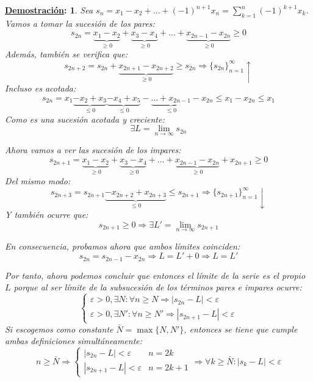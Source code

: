 \documentclass[10pt,a4paper,openright]{book}
\theoremstyle{break}
\newtheorem*{demo}{\underline{Demostración}:}
\begin{document}
\begin{demo}
Sea $s_n = x_1 - x_2 + \ldots + (-1)^{n+1}x_n = \sum_{k=1}^{n} (-1)^{k+1} x_k$. Vamos a tomar la sucesión de los pares:
$$s_{2n} = \underbrace{x_1 - x_2}_{\geq 0} + \underbrace{x_3 - x_4}_{\geq 0} + \ldots + \underbrace{x_{2n-1} - x_{2n}}_{\geq 0} \geq 0$$
Además, también se verifica que:
$$s_{2n + 2} = s_{2n} + \underbrace{x_{2n + 1} - x_{2n + 2}}_{\geq 0} \geq s_{2n} \Rightarrow \{s_{2n}\}_{n=1}^\infty\uparrow$$
Incluso es acotada:
$$s_{2n} = x_1 \underbrace{-x_2 + x_3}_{\leq 0 } \underbrace{- x_4 + x_5 }_{\leq 0}- \underbrace{\ldots + x_{2n-1}}_{\leq 0} - x_{2n}\leq x_1 - x_{2n} \leq x_1 $$
Como es una sucesión acotada y creciente:
$$\exists L = \lim_{n \to \infty} s_{2n}$$

Ahora vamos a ver las sucesión de los impares:
$$s_{2n+1} =\underbrace{x_1 - x_2}_{\geq 0} + \underbrace{x_3 - x_4}_{\geq 0} + \ldots +\underbrace{x_{2n-1} - x_{2n}}_{\geq 0} + x_{2n+1} \geq 0$$
Del mismo modo:
$$s_{2n+3} = s_{2n+1} \underbrace{-x_{2n + 2} + x_{2n + 3}}_{\leq 0} \leq s_{2n+1} \Rightarrow  \{s_{2n+1}\}_{n=1}^\infty \downarrow$$
Y también ocurre que: 
$$s_{2n+1} \geq 0 \Rightarrow \exists L' = \lim_{n \to \infty} s_{2n+1}$$

En consecuencia, probamos ahora que ambos límites coinciden:
$$s_{2n} = s_{2n-1} - x_{2n} \Rightarrow L = L' + 0 \Rightarrow L = L'$$

Por tanto, ahora podemos concluir que entonces el límite de la serie es el propio $L$ porque al ser límite de la subsucesión de los términos pares e impares ocurre:
$$\begin{cases} \varepsilon > 0, \exists N : \forall n \geq N \Rightarrow |s_{2n} - L|<\varepsilon \\ \varepsilon > 0, \exists N' : \forall n \geq N' \Rightarrow |s_{2n+1} - L|<\varepsilon\end{cases} $$
Si escogemos como constante $\bar{N} = \max\{N, N'\}$, entonces se tiene que cumple ambas definiciones simultáneamente:
$$n \geq \bar{N} \Rightarrow \begin{cases} |s_{2n} - L|<\varepsilon & n = 2k \\ |s_{2n+1} - L|<\varepsilon & n = 2k+1\end{cases} \Rightarrow \forall k \geq \bar{N}: |s_k-L|<\varepsilon$$
\end{demo}
\end{document}
